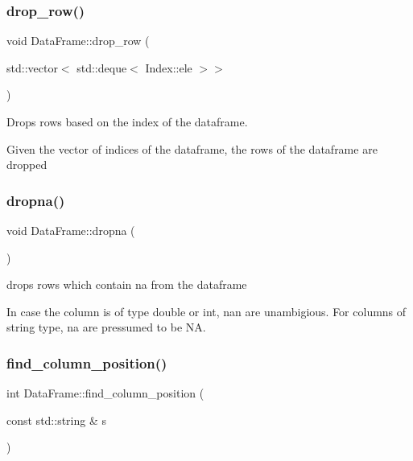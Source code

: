 \subsubsection{\texorpdfstring{drop\+\_\+row()}{drop\_row()}}
{\footnotesize\ttfamily void Data\+Frame\+::drop\+\_\+row (\begin{DoxyParamCaption}\item[{std\+::vector$<$ std\+::deque$<$ Index\+::ele $>$$>$}]{ }\end{DoxyParamCaption})}



Drops rows based on the index of the dataframe. 

Given the vector of indices of the dataframe, the rows of the dataframe are dropped \mbox{\label{classDataFrame_a6abc672ac4c439e3e785bd3f84c8da15}} 
\subsubsection{\texorpdfstring{dropna()}{dropna()}}
{\footnotesize\ttfamily void Data\+Frame\+::dropna (\begin{DoxyParamCaption}{ }\end{DoxyParamCaption})}



drops rows which contain na from the dataframe 

In case the column is of type double or int, nan are unambigious. For columns of string type, na are pressumed to be \textquotesingle{}NA\textquotesingle{}. \mbox{\label{classDataFrame_a24a13f1ad2e723ad048e1486d335191a}} 
\subsubsection{\texorpdfstring{find\+\_\+column\+\_\+position()}{find\_column\_position()}}
{\footnotesize\ttfamily int Data\+Frame\+::find\+\_\+column\+\_\+position (\begin{DoxyParamCaption}\item[{const std\+::string \&}]{s }\end{DoxyParamCaption})\hspace{0.3cm}{\ttfamily [private]}}



